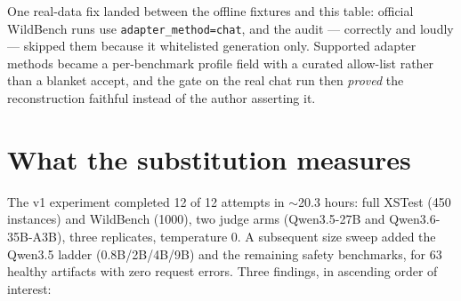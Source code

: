 \documentclass[11pt]{report}
\newcommand{\code}[1]{\texttt{#1}}
\begin{document}
One real-data fix landed between the offline fixtures and this table: official
WildBench runs use \code{adapter\_method=chat}, and the audit --- correctly and
loudly --- skipped them because it whitelisted generation only. Supported adapter
methods became a per-benchmark profile field with a curated allow-list rather than a
blanket accept, and the gate on the real chat run then \emph{proved} the
reconstruction faithful instead of the author asserting it.

\section{What the substitution measures}

The v1 experiment completed 12 of 12 attempts in $\sim$20.3 hours: full XSTest (450
instances) and WildBench (1000), two judge arms (Qwen3.5-27B and Qwen3.6-35B-A3B),
three replicates, temperature 0. A subsequent size sweep added the Qwen3.5 ladder
(0.8B/2B/4B/9B) and the remaining safety benchmarks, for 63 healthy artifacts with
zero request errors. Three findings, in ascending order of interest:
\end{document}
